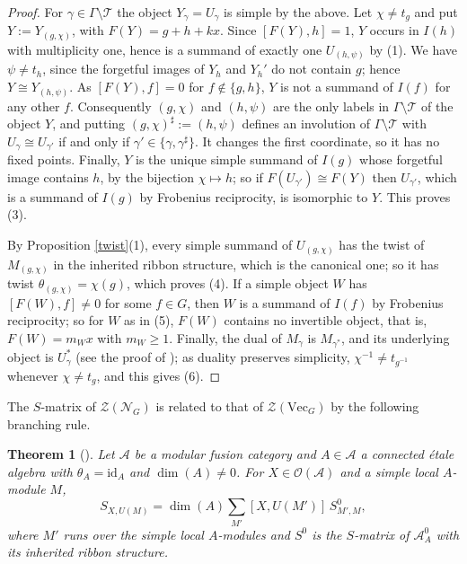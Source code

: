 \documentclass[10pt]{article}
\theoremstyle{plain}
\newtheorem{theorem}{Theorem}[section]
\theoremstyle{definition}
\theoremstyle{plain}
\begin{document}
\begin{proof}
\par For $\gamma\in\Gamma\setminus\mathcal{T}$ the object $Y_\gamma=U_\gamma$ is simple by the above. Let $\chi\neq t_g$ and put $Y:=Y_{(g,\chi)}$, with $F(Y)=g+h+kx$. Since $[F(Y),h]=1$, $Y$ occurs in $I(h)$ with multiplicity one, hence is a summand of exactly one $U_{(h,\psi)}$ by (1). We have $\psi\neq t_h$, since the forgetful images of $Y_h$ and $Y_h'$ do not contain $g$; hence $Y\cong Y_{(h,\psi)}$. As $[F(Y),f]=0$ for $f\notin\{g,h\}$, $Y$ is not a summand of $I(f)$ for any other $f$. Consequently $(g,\chi)$ and $(h,\psi)$ are the only labels in $\Gamma\setminus\mathcal{T}$ of the object $Y$, and putting $(g,\chi)^\sharp:=(h,\psi)$ defines an involution of $\Gamma\setminus\mathcal{T}$ with $U_\gamma\cong U_{\gamma'}$ if and only if $\gamma'\in\{\gamma,\gamma^\sharp\}$. It changes the first coordinate, so it has no fixed points. Finally, $Y$ is the unique simple summand of $I(g)$ whose forgetful image contains $h$, by the bijection $\chi\mapsto h$; so if $F(U_{\gamma'})\cong F(Y)$ then $U_{\gamma'}$, which is a summand of $I(g)$ by Frobenius reciprocity, is isomorphic to $Y$. This proves (3).

\par By Proposition \ref{twist}(1), every simple summand of $U_{(g,\chi)}$ has the twist of $M_{(g,\chi)}$ in the inherited ribbon structure, which is the canonical one; so it has twist $\theta_{(g,\chi)}=\chi(g)$, which proves (4). If a simple object $W$ has $[F(W),f]\neq0$ for some $f\in G$, then $W$ is a summand of $I(f)$ by Frobenius reciprocity; so for $W$ as in (5), $F(W)$ contains no invertible object, that is, $F(W)=m_Wx$ with $m_W\geq1$. Finally, the dual of $M_\gamma$ is $M_{\gamma^\ast}$, and its underlying object is $U_\gamma^\ast$ (see the proof of \cite[Theorem 1.15]{MR1936496}); as duality preserves simplicity, $\chi^{-1}\neq t_{g^{-1}}$ whenever $\chi\neq t_g$, and this gives (6).
\end{proof}

The $S$-matrix of $\mathcal{Z}(\mathcal{N}_G)$ is related to that of $\mathcal{Z}(\mathrm{Vec}_G)$ by the following branching rule.

\begin{theorem}[{\cite[Theorem 4.1]{MR1936496}}]\label{thm:branch}
Let $\mathcal{A}$ be a modular fusion category and $A\in\mathcal{A}$ a connected \'etale algebra with $\theta_A=\mathrm{id}_A$ and $\dim(A)\neq0$. For $X\in\mathcal{O}(\mathcal{A})$ and a simple local $A$-module $M$,
\begin{equation}\label{eq:branch}
S_{X,U(M)}=\dim(A)\sum_{M'}[X,U(M')]\,S^{0}_{M',M},
\end{equation}
where $M'$ runs over the simple local $A$-modules and $S^0$ is the $S$-matrix of $\mathcal{A}^0_A$ with its inherited ribbon structure.
\end{theorem}
\end{document}
